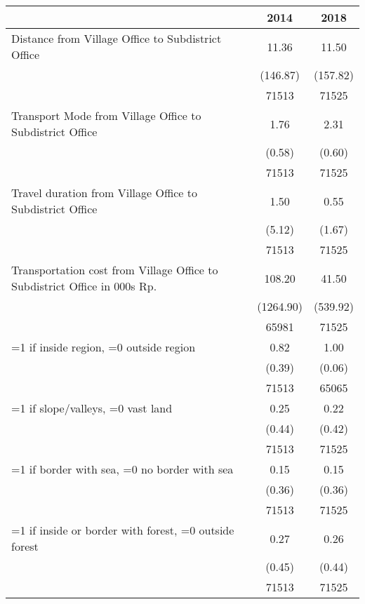 \begin{tabular}{l*{2}{c}}
\hline\hline
                    &        2014&        2018\\
\hline
Distance from Village Office to Subdistrict Office&       11.36&       11.50\\
                    &    (146.87)&    (157.82)\\
                    &       71513&       71525\\
[1em]
Transport Mode from Village Office to Subdistrict Office&        1.76&        2.31\\
                    &      (0.58)&      (0.60)\\
                    &       71513&       71525\\
[1em]
Travel duration from Village Office to Subdistrict Office&        1.50&        0.55\\
                    &      (5.12)&      (1.67)\\
                    &       71513&       71525\\
[1em]
Transportation cost from Village Office to Subdistrict Office in 000s Rp.&      108.20&       41.50\\
                    &   (1264.90)&    (539.92)\\
                    &       65981&       71525\\
[1em]
=1 if inside region, =0 outside region&        0.82&        1.00\\
                    &      (0.39)&      (0.06)\\
                    &       71513&       65065\\
[1em]
=1 if slope/valleys, =0 vast land&        0.25&        0.22\\
                    &      (0.44)&      (0.42)\\
                    &       71513&       71525\\
[1em]
=1 if border with sea, =0 no border with sea&        0.15&        0.15\\
                    &      (0.36)&      (0.36)\\
                    &       71513&       71525\\
[1em]
=1 if inside or border with forest, =0 outside forest&        0.27&        0.26\\
                    &      (0.45)&      (0.44)\\
                    &       71513&       71525\\
[1em]

\end{tabular}

